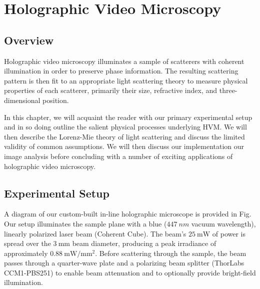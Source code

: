 \chapter{Holographic Video Microscopy}
\label{ch:hvm}


\newcommand{\einc}{\vec{E}_{\text{inc}}}
\newcommand{\escat}{\vec{E}_{\text{s}}}
\newcommand{\eadd}{\vec{E}_{\text{add}}}


\section{Overview}



Holographic video microscopy illuminates a sample of scatterers with
coherent illumination in order to preserve phase information. 
The resulting scattering pattern is then
fit to an appropriate light scattering theory to measure physical properties
of each scatterer, primarily their size, refractive index, and
three-dimensional position.

In this chapter, we will acquaint the reader with our primary experimental
setup and in so doing outline the salient physical processes underlying
HVM. We will then describe the Lorenz-Mie theory of light
scattering and discuss the limited validity of common assumptions.
We will then discuss our implementation our image analysis before
concluding with a number of exciting applications of holographic video
microscopy.


\section{Experimental Setup}
\label{ch:hvm:sec:hvm}

A diagram of our custom-built in-line holographic microscope
is provided in Fig.~%
Our setup illuminates
the sample plane with a blue ($\SI{447}{nm}$ vacuum wavelength),
linearly polarized laser beam (Coherent Cube). The beam's
$\SI{25}{\mW}$ of power is spread over the $\SI{3}{\mm}$ beam
diameter, producing a peak irradiance of approximately
$\SI{0.88}{\mW / \mm^2}$. Before scattering through the
sample, the beam passes through a quarter-wave plate and a
polarizing beam splitter (ThorLabs CCM1-PBS251) to enable
beam attenuation and to optionally provide bright-field
illumination.

